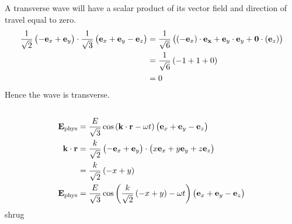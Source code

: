 \subsection{}
A transverse wave will have a scalar product of its vector field and direction of travel equal to zero.
\begin{align*}
    \frac{1}{\sqrt{2}} \del{-\mathbf{e}_x + \mathbf{e}_y} \cdot \frac{1}{\sqrt{3}} \del{\mathbf{e}_x + \mathbf{e}_y - \mathbf{e}_z} & = \frac{1}{\sqrt{6}}\del{\del{-\mathbf{e}_x} \cdot {\mathbf{e_x} + \mathbf{e}_y \cdot \mathbf{e}_y + \mathbf{0} \cdot \del{\mathbf{e}_z}}}\\
    & = \frac{1}{\sqrt{6}} \del{-1 + 1 + 0}\\
    & = 0
\end{align*}
Hence the wave is transverse.

\subsection{}
\begin{align*}
    \mathbf{E}_{\textrm{phys}} & = \frac{E}{\sqrt{3}} \cos{\del{\mathbf{k} \cdot \mathbf{r} - \omega t}} \del{\mathbf{e}_x + \mathbf{e}_y - \mathbf{e}_z}\\
    \mathbf{k} \cdot \mathbf{r} & = \frac{k}{\sqrt{2}} \del{- \mathbf{e}_x + \mathbf{e}_y} \cdot \del{x \mathbf{e}_x + y \mathbf{e}_y + z \mathbf{e}_z}\\
    & = \frac{k}{\sqrt{2}} \del{-x + y}\\
    \mathbf{E}_{\textrm{phys}} & = \frac{E}{\sqrt{3}} \cos{\del{\frac{k}{\sqrt{2}} \del{-x + y} - \omega t}} \del{\mathbf{e}_x + \mathbf{e}_y - \mathbf{e}_z}
\end{align*}
shrug
